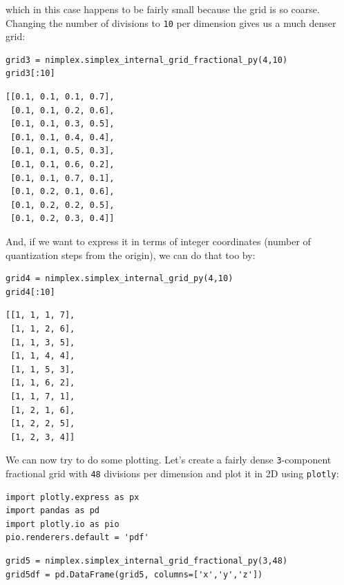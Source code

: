 which in this case happens to be fairly small because the grid is so
coarse. Changing the number of divisions to \texttt{10}
per dimension gives us a much denser grid:

\begin{verbatim}
grid3 = nimplex.simplex_internal_grid_fractional_py(4,10)
grid3[:10]
\end{verbatim}

\begin{verbatim}
[[0.1, 0.1, 0.1, 0.7],
 [0.1, 0.1, 0.2, 0.6],
 [0.1, 0.1, 0.3, 0.5],
 [0.1, 0.1, 0.4, 0.4],
 [0.1, 0.1, 0.5, 0.3],
 [0.1, 0.1, 0.6, 0.2],
 [0.1, 0.1, 0.7, 0.1],
 [0.1, 0.2, 0.1, 0.6],
 [0.1, 0.2, 0.2, 0.5],
 [0.1, 0.2, 0.3, 0.4]]
\end{verbatim}

And, if we want to express it in terms of integer coordinates (number of
quantization steps from the origin), we can do that too by:

\begin{verbatim}
grid4 = nimplex.simplex_internal_grid_py(4,10)
grid4[:10]
\end{verbatim}

\begin{verbatim}
[[1, 1, 1, 7],
 [1, 1, 2, 6],
 [1, 1, 3, 5],
 [1, 1, 4, 4],
 [1, 1, 5, 3],
 [1, 1, 6, 2],
 [1, 1, 7, 1],
 [1, 2, 1, 6],
 [1, 2, 2, 5],
 [1, 2, 3, 4]]
\end{verbatim}

We can now try to do some plotting. Let's create a fairly dense
\texttt{3}-component fractional grid with
\texttt{48} divisions per dimension and plot it in 2D
using \texttt{plotly}:

\begin{verbatim}
import plotly.express as px
import pandas as pd
import plotly.io as pio
pio.renderers.default = 'pdf'
\end{verbatim}

\begin{verbatim}
grid5 = nimplex.simplex_internal_grid_fractional_py(3,48)
grid5df = pd.DataFrame(grid5, columns=['x','y','z'])
\end{verbatim}

